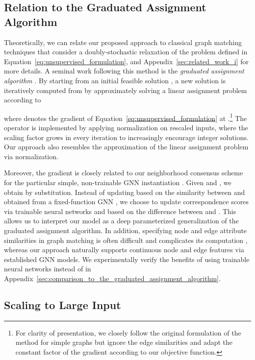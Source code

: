 \documentclass{article}
\begin{document}
\subsection{Relation to the Graduated Assignment Algorithm}\label{sub:relation_to_the_graduated_assignment}

Theoretically, we can relate our proposed approach to classical graph matching techniques that consider a doubly-stochastic relaxation of the problem defined in Equation~\eqref{eq:unsupervised_formulation}, \cf{} \citep{Lyzinski/etal/2016} and Appendix~\ref{sec:related_work_i} for more details.
A seminal work following this method is the \emph{graduated assignment algorithm} \citep{Gold/Rangarajan/1996}.
By starting from an initial feasible solution , a new solution  is iteratively computed from  by approximately solving a linear assignment problem according to

where  denotes the gradient of Equation~\eqref{eq:unsupervised_formulation} at .\footnote{For clarity of presentation, we closely follow the original formulation of the method for simple graphs but ignore the edge similarities and adapt the constant factor of the gradient according to our objective function.}
The  operator is implemented by applying  normalization on rescaled inputs, where the scaling factor grows in every iteration to increasingly encourage integer solutions.
Our approach also resembles the approximation of the linear assignment problem via  normalization.

Moreover, the gradient  is closely related to our neighborhood consensus scheme for the particular simple, non-trainable GNN instantiation .
Given  and , we obtain  by substitution.
Instead of updating  based on the similarity between  and  obtained from a fixed-function GNN , we choose to update correspondence scores via trainable neural networks  and  based on the difference between  and .
This allows us to interpret our model as a deep parameterized generalization of the graduated assignment algorithm.
In addition, specifying node and edge attribute similarities in graph matching is often difficult and complicates its computation \citep{Zhou/DeLaTorre/2016,Zhang/etal/2019}, whereas our approach naturally supports continuous node and edge features via established GNN models.
We experimentally verify the benefits of using trainable neural networks  instead of  in Appendix~\ref{sec:comparison_to_the_graduated_assignment_algorithm}.

\subsection{Scaling to Large Input}\label{sub:scaling_to_large_input}
\end{document}
